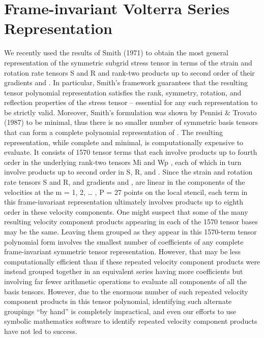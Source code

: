 \graphicspath{ {./Ch8/}  } 

\chapter{Frame-invariant Volterra Series Representation }

We recently used the results of Smith (1971) to obtain the most general representation of the symmetric subgrid stress tensor   in terms of the strain and rotation rate tensors S and R and rank-two products up to second order of their gradients   and  . In particular, Smith’s framework guarantees that the resulting tensor polynomial representation satisfies the rank, symmetry, rotation, and reflection properties of the stress tensor   – essential for any such representation to be strictly valid.  Moreover, Smith’s formulation was shown by Pennisi & Trovato (1987) to be minimal, thus there is no smaller number of symmetric basis tensors that can form a complete polynomial representation of  .   
The resulting representation, while complete and minimal, is computationally expensive to evaluate.  It consists of 1570 tensor terms that each involve products up to fourth order in the underlying rank-two tensors Mi and Wp , each of which in turn involve products up to second order in S, R,   and  .  Since the strain and rotation rate tensors S and R, and gradients   and  , are linear in the components of the velocities   at the m = 1, 2, … , P = 27 points on the local   stencil, each term in this frame-invariant representation ultimately involves products up to eighth order in these velocity components.  
One might suspect that some of the many resulting velocity component products appearing in each of the 1570 tensor bases may be the same. Leaving them grouped as they appear in this 1570-term tensor polynomial form involves the smallest number of coefficients of any complete frame-invariant symmetric tensor representation. However, that may be less computationally efficient than if these repeated velocity component products were instead grouped together in an equivalent series having more coefficients but involving far fewer arithmetic operations to evaluate all components of all the basis tensors. However, due to the enormous number of such repeated velocity component products in this tensor polynomial, identifying such alternate groupings “by hand” is completely impractical, and even our efforts to use symbolic mathematics software to identify repeated velocity component products have not led to success.
